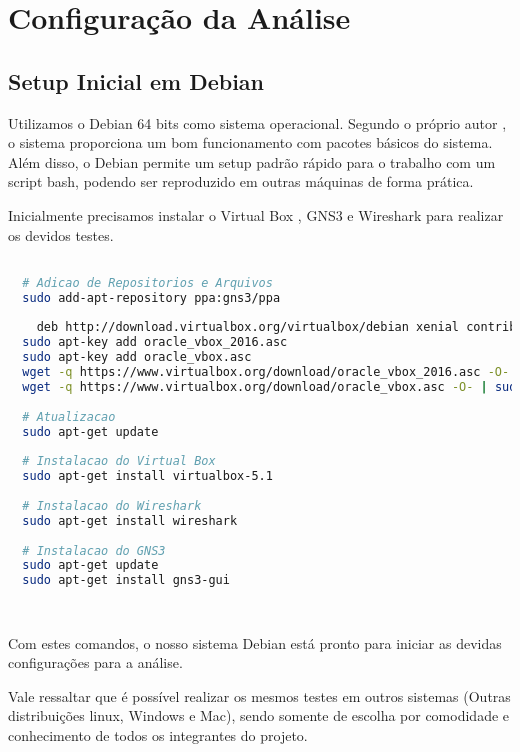 \chapter{Configuração da Análise}
\label{ch:ferramentas}

\section{Setup Inicial em Debian}

Utilizamos o Debian 64 bits como sistema operacional. Segundo o próprio autor \cite{spi}, o sistema proporciona um bom funcionamento com pacotes básicos do sistema. Além disso, o Debian permite um setup padrão rápido para o trabalho com um script bash, podendo ser reproduzido em outras máquinas de forma prática.

Inicialmente precisamos instalar o Virtual Box \cite{oracle_vb}, GNS3 \cite{gns3_install} e Wireshark \cite{linoxide} para realizar os devidos testes.
\begin{lstlisting}[language=bash]

  # Adicao de Repositorios e Arquivos
  sudo add-apt-repository ppa:gns3/ppa
  
    deb http://download.virtualbox.org/virtualbox/debian xenial contrib
  sudo apt-key add oracle_vbox_2016.asc
  sudo apt-key add oracle_vbox.asc
  wget -q https://www.virtualbox.org/download/oracle_vbox_2016.asc -O- | sudo apt-key add -
  wget -q https://www.virtualbox.org/download/oracle_vbox.asc -O- | sudo apt-key add -
  
  # Atualizacao
  sudo apt-get update
  
  # Instalacao do Virtual Box
  sudo apt-get install virtualbox-5.1
  
  # Instalacao do Wireshark
  sudo apt-get install wireshark
  
  # Instalacao do GNS3
  sudo apt-get update
  sudo apt-get install gns3-gui

  
\end{lstlisting}

Com estes comandos, o nosso sistema Debian está pronto para iniciar as devidas configurações para a análise.

Vale ressaltar que é possível realizar os mesmos testes em outros sistemas (Outras distribuições linux, Windows e Mac), sendo somente de escolha por comodidade e conhecimento de todos os integrantes do projeto.

